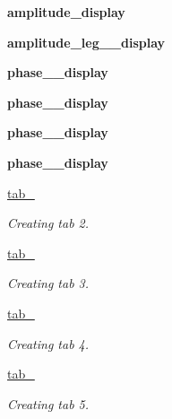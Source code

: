 \begin{DoxyCompactItemize}
\mbox{\label{classuser__interface_1_1GUI_ab339519e45fa45441941d2f8cca0c970}} 
{\bfseries amplitude\+\_\+display}
\item 
\mbox{\label{classuser__interface_1_1GUI_a6b22184033e43b0a0515b11056279295}} 
{\bfseries amplitude\+\_\+leg\+\_\+\_\+display}
\item 
\mbox{\label{classuser__interface_1_1GUI_a1726bedfcc8f0f0ea5fc4df66ad71875}} 
{\bfseries phase\+\_\+\_\+display}
\item 
\mbox{\label{classuser__interface_1_1GUI_af0c7710c2efc7f91d70e2bbdddeb4b75}} 
{\bfseries phase\+\_\+\_\+display}
\item 
\mbox{\label{classuser__interface_1_1GUI_adb798257b09525e995cf586791bf9869}} 
{\bfseries phase\+\_\+\_\+display}
\item 
\mbox{\label{classuser__interface_1_1GUI_afbf653993b440e69569fc9048ef666af}} 
{\bfseries phase\+\_\+\_\+display}
\item 
\hyperlink{classuser__interface_1_1GUI_acefb21f84a9df9452809e47c3e51f2c8}{tab\+\_}
\begin{DoxyCompactList}\small\item\em Creating tab 2. \end{DoxyCompactList}\item 
\hyperlink{classuser__interface_1_1GUI_ac33f7cc0401cc93451f1f781b3e2d483}{tab\+\_}
\begin{DoxyCompactList}\small\item\em Creating tab 3. \end{DoxyCompactList}\item 
\hyperlink{classuser__interface_1_1GUI_aa6bbcd6a1d815a578bed66410c80e060}{tab\+\_}
\begin{DoxyCompactList}\small\item\em Creating tab 4. \end{DoxyCompactList}\item 
\hyperlink{classuser__interface_1_1GUI_ab787838b77b2eee132c0ae6fddc6de0c}{tab\+\_}
\begin{DoxyCompactList}\small\item\em Creating tab 5. \end{DoxyCompactList}\item 

\end{DoxyCompactItemize}
